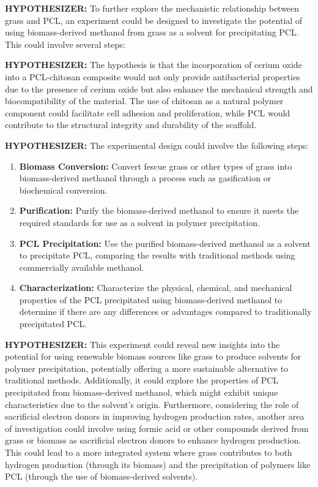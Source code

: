 \documentclass{article}
\begin{document}
\begin{leftbubbles}
\textbf{HYPOTHESIZER: }To further explore the mechanistic relationship between grass and PCL, an experiment could be designed to investigate the potential of using biomass-derived methanol from grass as a solvent for precipitating PCL. This could involve several steps:

\textbf{HYPOTHESIZER:} The hypothesis is that the incorporation of cerium oxide into a PCL-chitosan composite would not only provide antibacterial properties due to the presence of cerium oxide but also enhance the mechanical strength and biocompatibility of the material. The use of chitosan as a natural polymer component could facilitate cell adhesion and proliferation, while PCL would contribute to the structural integrity and durability of the scaffold.

\textbf{HYPOTHESIZER:} The experimental design could involve the following steps:
\begin{enumerate}
    \item \textbf{Biomass Conversion:} Convert fescue grass or other types of grass into biomass-derived methanol through a process such as gasification or biochemical conversion.
    \item \textbf{Purification:} Purify the biomass-derived methanol to ensure it meets the required standards for use as a solvent in polymer precipitation.
    \item \textbf{PCL Precipitation:} Use the purified biomass-derived methanol as a solvent to precipitate PCL, comparing the results with traditional methods using commercially available methanol.
    \item \textbf{Characterization:} Characterize the physical, chemical, and mechanical properties of the PCL precipitated using biomass-derived methanol to determine if there are any differences or advantages compared to traditionally precipitated PCL.
\end{enumerate}

\textbf{HYPOTHESIZER:} This experiment could reveal new insights into the potential for using renewable biomass sources like grass to produce solvents for polymer precipitation, potentially offering a more sustainable alternative to traditional methods. Additionally, it could explore the properties of PCL precipitated from biomass-derived methanol, which might exhibit unique characteristics due to the solvent's origin. Furthermore, considering the role of sacrificial electron donors in improving hydrogen production rates, another area of investigation could involve using formic acid or other compounds derived from grass or biomass as sacrificial electron donors to enhance hydrogen production. This could lead to a more integrated system where grass contributes to both hydrogen production (through its biomass) and the precipitation of polymers like PCL (through the use of biomass-derived solvents).
\end{leftbubbles}
\end{document}
